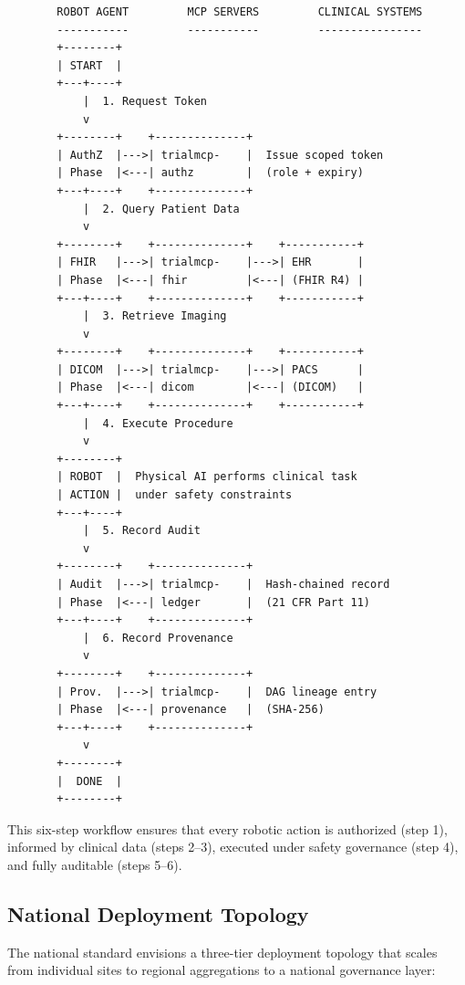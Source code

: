 \documentclass{article}
\begin{document}
\begin{figure}[H]
\begin{verbatim}
  ROBOT AGENT         MCP SERVERS         CLINICAL SYSTEMS
  -----------         -----------         ----------------
  +--------+
  | START  |
  +---+----+
      |  1. Request Token
      v
  +--------+    +--------------+
  | AuthZ  |--->| trialmcp-    |  Issue scoped token
  | Phase  |<---| authz        |  (role + expiry)
  +---+----+    +--------------+
      |  2. Query Patient Data
      v
  +--------+    +--------------+    +-----------+
  | FHIR   |--->| trialmcp-    |--->| EHR       |
  | Phase  |<---| fhir         |<---| (FHIR R4) |
  +---+----+    +--------------+    +-----------+
      |  3. Retrieve Imaging
      v
  +--------+    +--------------+    +-----------+
  | DICOM  |--->| trialmcp-    |--->| PACS      |
  | Phase  |<---| dicom        |<---| (DICOM)   |
  +---+----+    +--------------+    +-----------+
      |  4. Execute Procedure
      v
  +--------+
  | ROBOT  |  Physical AI performs clinical task
  | ACTION |  under safety constraints
  +---+----+
      |  5. Record Audit
      v
  +--------+    +--------------+
  | Audit  |--->| trialmcp-    |  Hash-chained record
  | Phase  |<---| ledger       |  (21 CFR Part 11)
  +---+----+    +--------------+
      |  6. Record Provenance
      v
  +--------+    +--------------+
  | Prov.  |--->| trialmcp-    |  DAG lineage entry
  | Phase  |<---| provenance   |  (SHA-256)
  +---+----+    +--------------+
      v
  +--------+
  |  DONE  |
  +--------+
\end{verbatim}
\end{figure}

This six-step workflow ensures that every robotic action is authorized (step 1), informed by clinical data (steps 2--3), executed under safety governance (step 4), and fully auditable (steps 5--6).

\subsection{National Deployment Topology}

The national standard envisions a three-tier deployment topology that scales from individual sites to regional aggregations to a national governance layer:
\end{document}
